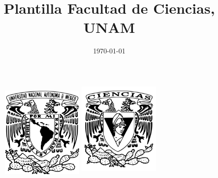 \documentclass{article}
\title{Plantilla Facultad de Ciencias, UNAM}
\date{\today}
\begin{document}
\thispagestyle{empty}
	
	\begin{figure}[ht]
			\includegraphics[width=4cm]{Logo_UNAM.png}
			\label{EscudoUNAM}
	   \endminipage
			\includegraphics[height = 4.9cm ,width=4cm]{Logo_FC.png}
			\label{EscudoFC}
		\endminipage
	\end{figure}
	
\end{document}
